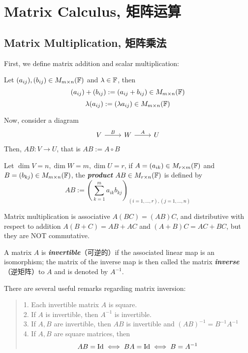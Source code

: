 \section{Matrix Calculus, 矩阵运算}

\subsection{Matrix Multiplication, 矩阵乘法}
First, we define matrix addition and scalar multiplication:
\begin{definition}
    Let $(a_{ij}), (b_{ij}) \in M_{m \times n}(\mathbb{F})$ and $\lambda \in \mathbb{F}$, then
    $$(a_{ij}) + (b_{ij}) := (a_{ij} + b_{ij}) \in M_{m \times n}(\mathbb{F})$$
    $$\lambda(a_{ij}) := (\lambda a_{ij}) \in M_{m \times n}(\mathbb{F})$$
\end{definition}
Now, consider a diagram
$$\begin{tikzcd}
    V \arrow[r, "B"]
        & W \arrow[r, "A"]
        & U
\end{tikzcd}$$
Then, $AB: V \to U$, that is $AB := A \circ B$
\begin{definition}
    Let $\dim V = n, \dim W = m, \dim U = r$, if $A = (a_{ik}) \in M_{r \times m}(\mathbb{F})$ and $B = (b_{kj}) \in M_{m \times n}(\mathbb{F})$, the \textbf{\textit{product}} $AB \in M_{r \times n}(\mathbb{F})$ is defined by
    $$AB := (\sum_{k=1}^m a_{ik}b_{kj})_{(i = 1, \dots, r), (j = 1, \dots, n)}$$
\end{definition}
Matrix multiplication is associative $A(BC) = (AB)C$, and distributive with respect to addition $A(B+C) = AB + AC$ and $(A+B)C = AC + BC$, but they are NOT commutative.
\begin{definition}
    A matrix $A$ is \textbf{\textit{invertible}}（可逆的）if the associated linear map is an isomorphism; the matrix of the inverse map is then called the matrix \textbf{\textit{inverse}}（逆矩阵）to $A$ and is denoted by $A^{-1}$.
\end{definition}
There are several useful remarks regarding matrix inversion:
\begin{quote}
    1. Each invertible matrix $A$ is square. \\
    2. If $A$ is invertible, then $A^{-1}$ is invertible. \\
    3. If $A, B$ are invertible, then $AB$ is invertible and $(AB)^{-1}=B^{-1}A^{-1}$ \\
    4. If $A, B$ are square matrices, then
    $$AB = \text{Id} \iff BA = \text{Id} \iff B = A^{-1}$$
\end{quote}

